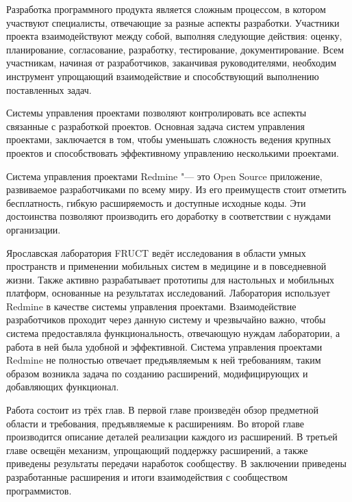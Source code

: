 Разработка программного продукта является сложным процессом, в котором
участвуют специалисты, отвечающие за разные аспекты разработки. Участники
проекта взаимодействуют между собой, выполняя следующие действия: оценку,
планирование, согласование, разработку, тестирование, документирование.  Всем
участникам, начиная от разработчиков, заканчивая руководителями, необходим
инструмент упрощающий взаимодействие и способствующий выполнению поставленных
задач.

Системы управления проектами позволяют контролировать все аспекты связанные с
разработкой проектов. Основная задача систем управления проектами, заключается в
том, чтобы уменьшать сложность ведения крупных проектов и способствовать
эффективному управлению несколькими проектами.

Система управления проектами Redmine "--- это Open Source приложение,
развиваемое разработчиками по всему миру. Из его преимуществ стоит
отметить бесплатность, гибкую расширяемость и доступные исходные коды. Эти
достоинства позволяют производить его доработку в соответствии с нуждами
организации.

Ярославская лаборатория FRUCT ведёт исследования в области умных пространств и
применении мобильных систем в медицине и в повседневной жизни.
Также активно разрабатывает прототипы для настольных и мобильных платформ,
основанные на результатах исследований. Лаборатория использует Redmine в
качестве системы управления проектами. Взаимодействие разработчиков проходит
через данную систему и чрезвычайно важно, чтобы система предоставляла
функциональность, отвечающую нуждам лаборатории, а работа в ней была удобной и
эффективной. Система управления проектами Redmine не полностью отвечает
предъявляемым к ней требованиям, таким образом возникла задача по созданию
расширений, модифицирующих и добавляющих функционал.

Работа состоит из трёх глав. В первой главе произведён обзор предметной области
и требования, предъявляемые к расширениям. Во второй главе производится
описание деталей реализации каждого из расширений. В третьей главе освещён
механизм, упрощающий поддержку расширений, а также приведены результаты
передачи наработок сообществу. В заключении приведены разработанные расширения
и итоги взаимодействия с сообществом программистов.

